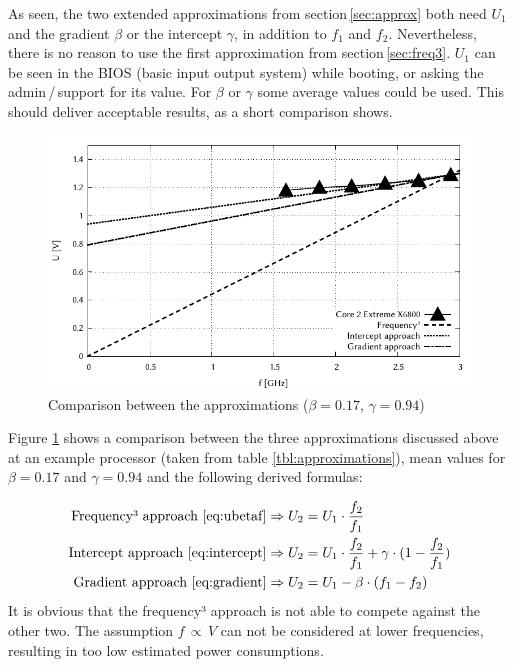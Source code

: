 \superpar
As seen, the two extended approximations from section\,\ref{sec:approx} both need $U_1$ and the gradient $\beta$ or the intercept $\gamma$, in addition to $f_1$ and $f_2$. Nevertheless, there is no reason to use the first approximation from section\,\ref{sec:freq3}. $U_1$ can be seen in the BIOS (basic input output system) while booting, or asking the admin\,/\,support for its value. For $\beta$ or $\gamma$ some average values could be used. This should deliver acceptable results, as a short comparison shows.
\label{sec:summary}
%
\begin{figure}[!hb]
	\centering
	\includegraphics[width=\linewidth]{pix/modelcompare/modelcompare}
	\caption[Comparison between the approximations]{Comparison between the approximations ($\beta = 0.17$, $\gamma = 0.94$)}
	\label{fig:modelcompare}
\end{figure}
%

\noindent
Figure \ref{fig:modelcompare} shows a comparison between the three approximations discussed above at an example processor (taken from table \ref{tbl:approximations}), mean values for $\beta = 0.17$ and $\gamma = 0.94$ and the following derived formulas:

%
\begin{align*}
\text{Frequency³ approach \eqref{eq:ubetaf}} &\Rightarrow U_2 = U_1 \cdot \frac{f_2}{f_1}\\
\text{Intercept approach \eqref{eq:intercept}} &\Rightarrow U_2 = U_1 \cdot \frac{f_2}{f_1} + \gamma \cdot (1 - \frac{f_2}{f_1})\\
\text{Gradient approach \eqref{eq:gradient}} &\Rightarrow U_2 = U_1 - \beta \cdot (f_1 - f_2)\\
\end{align*}
%
It is obvious that the frequency³ approach is not able to compete against the other two. The assumption $f \, \propto \, V$ can not be considered at lower frequencies, resulting in too low estimated power consumptions.


